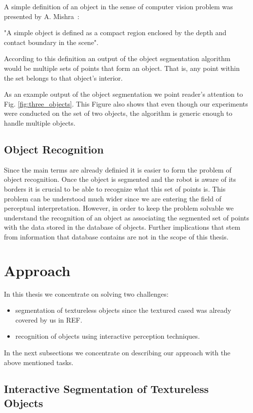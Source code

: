 A simple definition of an object in the sense of computer vision problem was presented by A. Mishra~\cite{mishra2012segmenting}:

"A simple object is defined as a compact region enclosed by the depth and
contact boundary in the scene".

According to this definition an output of the object segmentation algorithm would be multiple sets of points that form an object. That is, any point within the set belongs to that object's interior. 

As an example output of the object segmentation we point reader's attention to Fig. \ref{fig:three_objects}. This Figure also shows that even though our experiments were conducted on the set of two objects, the algorithm is generic enough to handle multiple objects. 

\subsection{Object Recognition}
Since the main terms are already definied it is easier to form the problem of object recognition. Once the object is segmented and the robot is aware of its borders it is crucial to be able to recognize what this set of points is. This problem can be understood much wider since we are entering the field of perceptual interpretation. However, in order to keep the problem solvable we understand the recognition of an object as associating the segmented set of points with the data stored in the database of objects. Further implications that stem from information that database contains are not in the scope of this thesis.

\section{Approach} 

In this thesis we concentrate on solving two challenges: 

\begin{itemize} 
\item segmentation of textureless objects since the textured cased was already covered by us in REF. 
\item recognition of objects using interactive perception techniques.
\end{itemize} 

In the next subsections we concentrate on describing our approach with the above mentioned tasks.

\subsection{Interactive Segmentation of Textureless Objects} 


